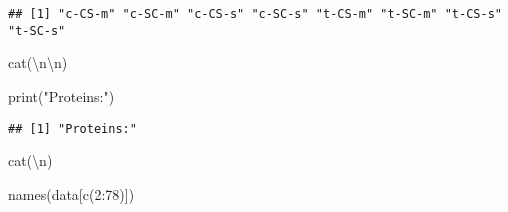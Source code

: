 \documentclass[
]{article}
\newenvironment{Shaded}{\begin{snugshade}}{\end{snugshade}}
\newcommand{\DecValTok}[1]{\textcolor[rgb]{0.00,0.00,0.81}{#1}}
\newcommand{\FunctionTok}[1]{\textcolor[rgb]{0.00,0.00,0.00}{#1}}
\newcommand{\NormalTok}[1]{#1}
\newcommand{\SpecialCharTok}[1]{\textcolor[rgb]{0.00,0.00,0.00}{#1}}
\newcommand{\StringTok}[1]{\textcolor[rgb]{0.31,0.60,0.02}{#1}}
\begin{document}
\begin{Shaded}
\end{Shaded}

\begin{verbatim}
## [1] "c-CS-m" "c-SC-m" "c-CS-s" "c-SC-s" "t-CS-m" "t-SC-m" "t-CS-s" "t-SC-s"
\end{verbatim}

\begin{Shaded}
\begin{Highlighting}[]
\FunctionTok{cat}\NormalTok{(}\StringTok{\textquotesingle{}}\SpecialCharTok{\textbackslash{}n\textbackslash{}n}\StringTok{\textquotesingle{}}\NormalTok{)}
\end{Highlighting}
\end{Shaded}

\begin{Shaded}
\begin{Highlighting}[]
\FunctionTok{print}\NormalTok{(}\StringTok{"Proteins:"}\NormalTok{)}
\end{Highlighting}
\end{Shaded}

\begin{verbatim}
## [1] "Proteins:"
\end{verbatim}

\begin{Shaded}
\begin{Highlighting}[]
\FunctionTok{cat}\NormalTok{(}\StringTok{\textquotesingle{}}\SpecialCharTok{\textbackslash{}n}\StringTok{\textquotesingle{}}\NormalTok{)}
\end{Highlighting}
\end{Shaded}

\begin{Shaded}
\begin{Highlighting}[]
\FunctionTok{names}\NormalTok{(data[}\FunctionTok{c}\NormalTok{(}\DecValTok{2}\SpecialCharTok{:}\DecValTok{78}\NormalTok{)])}
\end{Highlighting}
\end{Shaded}
\end{document}
